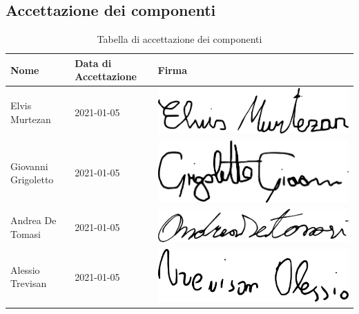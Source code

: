\subsection{Accettazione dei componenti}
{
	\renewcommand{\arraystretch}{2}
	\begin{longtable}{ C{5cm} C{4cm} C{5cm} }
		\caption{Tabella di accettazione dei componenti}\\
		\rowcolor{\primaryColor}
		\textcolor{\secondaryColor}{\textbf{Nome}} & \textcolor{\secondaryColor}{\textbf{Data di Accettazione}} & \textcolor{\secondaryColor}{\textbf{Firma}}\\	\endhead
		{Elvis Murtezan} & 2021-01-05 & \includegraphics[scale=0.20]{./src/Organigramma/immagini/firme/Elvis.png}\\
		{Giovanni Grigoletto} & 2021-01-05 & \includegraphics[scale=0.20]{./src/Organigramma/immagini/firme/giovanni.png}\\
		{Andrea De Tomasi} & 2021-01-05 & \includegraphics[scale=0.20]{./src/Organigramma/immagini/firme/andrea.png}\\
		{Alessio Trevisan} & 2021-01-05 & \includegraphics[scale=0.20]{./src/Organigramma/immagini/firme/alessio.png}\\

\end{longtable}}
